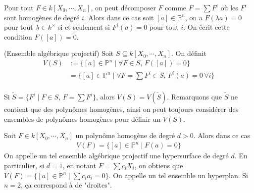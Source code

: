         \begin{remq}
            Pour tout $F \in k[X_0, \cdots, X_n]$, on peut décomposer $F$ comme $F = \sum F^i$ où les $F^i$ sont homogènes de degré $i$. Alors dans ce cas soit $[a] \in \mathbb{P}^n$, on a $F(\lambda a) = 0$ pour tout $\lambda \in k^\times$ si et seulement si $F^i(a) = 0$ pour tout $i$. On écrit cette condition $F([a]) = 0$. 
        \end{remq}
        \begin{defi} (Ensemble algébrique projectif)
            Soit $S \subseteq k[X_0, \cdots, X_n]$. On définit
            \begin{align*}
                V(S) &:= \{[a] \in \mathbb{P}^n \mid \forall F \in S,\, F([a]) = 0\} \\
                &= \{[a] \in \mathbb{P}^n \mid \forall F = \sum F^i \in S,\, F^i(a) = 0 \, \forall i\} \\
            \end{align*}
        \end{defi}
        \begin{remq}
            Si $\tilde S = \{F^i \mid F \in S,\, F = \sum F^i\}$, alors $V(S) = V(\tilde S)$. Remarquons que $\tilde S$ ne contient que des polynômes homogènes, ainsi on peut toujours considérer des ensembles de polynômes homogènes pour définir un $V(S)$.
        \end{remq}
        \begin{expl}
            Soit $F \in k[X_0, \cdots, X_n]$ un polynôme homogène de degré $d > 0$. Alors dans ce cas
            \begin{align*}
                V(F) = \{[a] \in \mathbb{P}^n \mid F(a) = 0\}
            \end{align*}
            On appelle un tel ensemble algébrique projectif une hypersurface de degré $d$. En particulier, si $d = 1$, en notant $F = \sum c_iX_i$, on obtiens que $V(F) = \{[a] \in \mathbb{P}^n \mid \sum c_ia_i = 0\}$. On appelle un tel ensemble un hyperplan. Si $n = 2$, ça correspond à de "droites".
        \end{expl}
